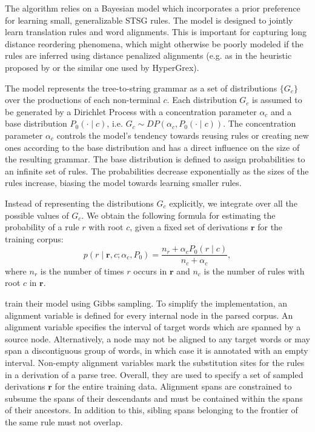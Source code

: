 \documentclass[nofonts]{pbml} %
\begin{document}
The algorithm relies on a Bayesian model which incorporates a prior preference for learning small, generalizable STSG rules. The model is designed to jointly learn translation rules and word alignments. This is important for capturing long distance reordering phenomena, which might otherwise be poorly modeled if the rules are inferred using distance penalized alignments (e.g. as in the heuristic proposed by \citet{Galley2004} or the similar one used by HyperGrex).

The model represents the tree-to-string grammar as a set of distributions $\{G_c\}$ over the productions of each non-terminal $c$. Each distribution $G_c$ is assumed to be generated by a Dirichlet Process with a concentration parameter $\alpha_c$ and a base distribution $P_0(\cdot \mid c)$, i.e. $G_c \sim DP(\alpha_c, P_0(\cdot \mid c))$. The concentration parameter $\alpha_c$ controls the model's tendency towards reusing rules or creating new ones according to the base distribution and has a direct influence on the size of the resulting grammar. The base distribution is defined to assign probabilities to an infinite set of rules. The probabilities decrease exponentially as the sizes of the rules increase, biasing the model towards learning smaller rules.

Instead of representing the distributions $G_c$ explicitly, we integrate over all the possible values of $G_c$. We obtain the following formula for estimating the probability of a rule $r$ with root $c$, given a fixed set of derivations $\textbf{r}$ for the training corpus:
\begin{equation}
p(r \mid \textbf{r}, c; \alpha_c, P_0) = \frac{n_{r} + \alpha_c P_0(r \mid c)}{n_{c} + \alpha_c},
\label{eq:sampling}
\end{equation}
where $n_{r}$ is the number of times $r$ occurs in $\textbf{r}$ and $n_{c}$ is the number of rules with root $c$ in $\textbf{r}$.

\citet{Cohn2009} train their model using Gibbs sampling. To simplify the implementation, an alignment variable is defined for every internal node in the parsed corpus. An alignment variable specifies the interval of target words which are spanned by a source node. Alternatively, a node may not be aligned to any target words or may span a discontiguous group of words, in which case it is annotated with an empty interval. Non-empty alignment variables mark the substitution sites for the rules in a derivation of a parse tree. Overall, they are used to specify a set of sampled derivations $\textbf{r}$ for the entire training data. Alignment spans are constrained to subsume the spans of their descendants and must be contained within the spans of their ancestors. In addition to this, sibling spans belonging to the frontier of the same rule must not overlap.
\end{document}
